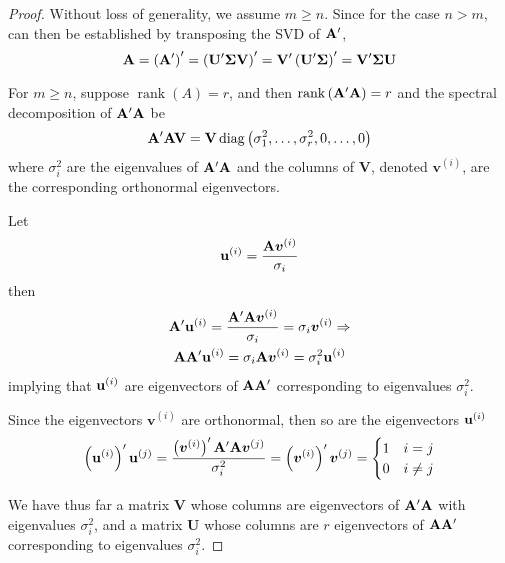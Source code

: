\begin{proof}
	Without loss of generality, we assume \(m\geq n\). Since for the case \(n>m\), can then be established by transposing the SVD of \(\mathbf{A}^{\prime}\),
	\begin{equation*}
		\mathbf{A}=\left(\mathbf{A}^{\prime}\right)^{\prime}=\left(\mathbf{U}^{\prime}\boldsymbol{\Sigma}\mathbf{V}\right)^{\prime}=\mathbf{V}^{\prime}\left(\mathbf{U}^{\prime}\boldsymbol{\Sigma}\right)^{\prime}=\mathbf{V}^{\prime}\boldsymbol{\Sigma}\mathbf{U}
	\end{equation*}

	For \(m\geq n\), suppose \(\operatorname{rank}(A)=r\), and then \(\operatorname{rank}\left(\mathbf{A}^{\prime}\mathbf{A}\right)=r\) and the spectral decomposition of \(\mathbf{A}^{\prime}\mathbf{A}\) be
	\begin{equation*}
		\mathbf{A}^{\prime}\mathbf{A}\mathbf{V}=\mathbf{V}\operatorname{diag}\left(\sigma_{1}^{2},\ldots,\sigma_{r}^{2},0,\ldots,0\right)
	\end{equation*}
	where \(\sigma_{i}^{2}\) are the eigenvalues of \(\mathbf{A}^{\prime}\mathbf{A}\) and the columns of \(\mathbf{V}\), denoted \(\boldsymbol{v}^{(i)}\), are the corresponding orthonormal eigenvectors.

	Let
	\begin{equation*}
		\mathbf{u}^{(i)}=\frac{\mathbf{A}\boldsymbol{v}^{(i)}}{\sigma_{i}}
	\end{equation*}
	then
	\begin{gather*}
		\mathbf{A}^{\prime}\mathbf{u}^{(i)}=\frac{\mathbf{A}^{\prime}\mathbf{A}\boldsymbol{v}^{(i)}}{\sigma_{i}}=\sigma_{i}\boldsymbol{v}^{(i)}\Rightarrow                       \\
		\mathbf{A}\mathbf{A}^{\prime}\mathbf{u}^{(i)}=\sigma_{i}\mathbf{A}\boldsymbol{v}^{(i)}=\sigma_{i}^{2}\mathbf{u}^{(i)}
	\end{gather*}
	implying that \(\mathbf{u}^{(i)}\) are eigenvectors of \(\mathbf{A}\mathbf{A}^{\prime}\) corresponding to eigenvalues \(\sigma_{i}^{2}\).

	Since the eigenvectors \(\boldsymbol{v}^{(i)}\) are orthonormal, then so are the eigenvectors \(\mathbf{u}^{(i)}\)
	\begin{equation*}
		\left(\mathbf{u}^{(i)}\right)^{\prime}\mathbf{u}^{(j)}=\frac{\left(\boldsymbol{v}^{(i)}\right)^{\prime}\mathbf{A}^{\prime}\mathbf{A}\boldsymbol{v}^{(j)}}{\sigma_{i}^{2}}=\left(\boldsymbol{v}^{(i)}\right)^{\prime}\boldsymbol{v}^{(j)}=\begin{cases}1 & i=j \\ 0 & i \neq j\end{cases}
	\end{equation*}

	We have thus far a matrix \(\mathbf{V}\) whose columns are eigenvectors of \(\mathbf{A}^{\prime}\mathbf{A}\) with eigenvalues \(\sigma_{i}^{2}\), and a matrix \(\mathbf{U}\) whose columns are \(r\) eigenvectors of \(\mathbf{A}\mathbf{A}^{\prime}\) corresponding to eigenvalues \(\sigma_{i}^{2}\).


\end{proof}
